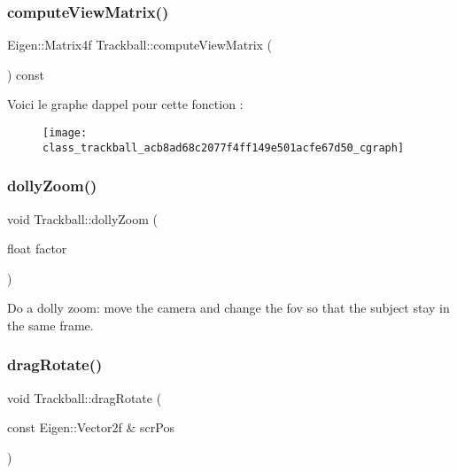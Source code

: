 \subsubsection{\texorpdfstring{compute\+View\+Matrix()}{computeViewMatrix()}}
{\footnotesize\ttfamily Eigen\+::\+Matrix4f Trackball\+::compute\+View\+Matrix (\begin{DoxyParamCaption}{ }\end{DoxyParamCaption}) const}

Voici le graphe d\textquotesingle{}appel pour cette fonction \+:
\nopagebreak
\begin{figure}[H]
\begin{center}
\leavevmode
\texttt{[image: class\_trackball\_acb8ad68c2077f4ff149e501acfe67d50\_cgraph]}
\end{center}
\end{figure}
\mbox{\label{class_trackball_a12d2e0436352bb7d222e2a3aed39e41c}} 
\subsubsection{\texorpdfstring{dolly\+Zoom()}{dollyZoom()}}
{\footnotesize\ttfamily void Trackball\+::dolly\+Zoom (\begin{DoxyParamCaption}\item[{float}]{factor }\end{DoxyParamCaption})}



Do a dolly zoom\+: move the camera and change the fov so that the subject stay in the same frame. 

\mbox{\label{class_trackball_a1dcd5aef16fd43aabfc0099183202437}} 
\subsubsection{\texorpdfstring{drag\+Rotate()}{dragRotate()}}
{\footnotesize\ttfamily void Trackball\+::drag\+Rotate (\begin{DoxyParamCaption}\item[{const Eigen\+::\+Vector2f \&}]{scr\+Pos }\end{DoxyParamCaption})}

